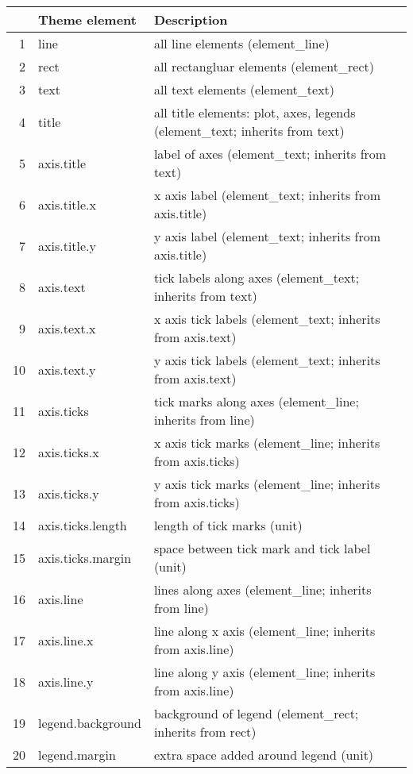 \begin{table}[ht]
\centering
\begin{tabular}{rll}
  \hline
 & Theme element & Description \\ 
  \hline
1 & line & all line elements (element\_line) \\ 
  2 & rect & all rectangluar elements (element\_rect) \\ 
  3 & text & all text elements (element\_text) \\ 
  4 & title & all title elements: plot, axes, legends (element\_text; inherits from text) \\ 
  5 & axis.title & label of axes (element\_text; inherits from text) \\ 
  6 & axis.title.x & x axis label (element\_text; inherits from axis.title) \\ 
  7 & axis.title.y & y axis label (element\_text; inherits from axis.title) \\ 
  8 & axis.text & tick labels along axes (element\_text; inherits from text) \\ 
  9 & axis.text.x & x axis tick labels (element\_text; inherits from axis.text) \\ 
  10 & axis.text.y & y axis tick labels (element\_text; inherits from axis.text) \\ 
  11 & axis.ticks & tick marks along axes (element\_line; inherits from line) \\ 
  12 & axis.ticks.x & x axis tick marks (element\_line; inherits from axis.ticks) \\ 
  13 & axis.ticks.y & y axis tick marks (element\_line; inherits from axis.ticks) \\ 
  14 & axis.ticks.length & length of tick marks (unit) \\ 
  15 & axis.ticks.margin & space between tick mark and tick label (unit) \\ 
  16 & axis.line & lines along axes (element\_line; inherits from line) \\ 
  17 & axis.line.x & line along x axis (element\_line; inherits from axis.line) \\ 
  18 & axis.line.y & line along y axis (element\_line; inherits from axis.line) \\ 
  19 & legend.background & background of legend (element\_rect; inherits from rect) \\ 
  20 & legend.margin & extra space added around legend (unit) \\ 

\end{tabular}
\end{table}
